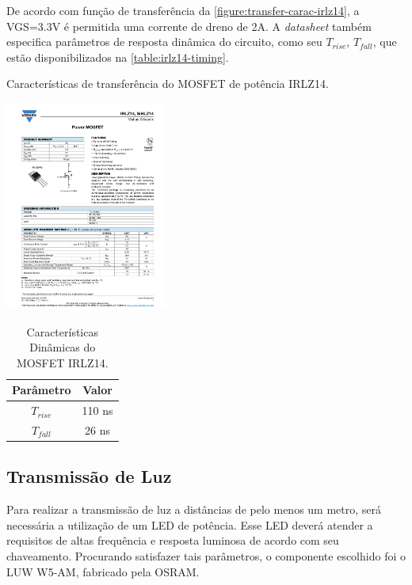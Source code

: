 	De acordo com função de transferência da \autoref{figure:transfer-carac-irlz14}, a VGS=3.3V é permitida uma corrente de dreno de 2A. A \textit{datasheet} também especifica parâmetros de resposta dinâmica do circuito, como seu $T_{rise}$, $T_{fall}$, que estão disponibilizados na \autoref{table:irlz14-timing}.
	
	\begin{chart}[h]
		\caption{\label{figure:transfer-carac-irlz14}Características de transferência do MOSFET de potência IRLZ14.}
		\centering
		\includegraphics[page=3, width=0.4\textwidth, trim={12cm 16.5cm 2.2cm 5cm}, clip]{circuits/irlz14.pdf}
	\end{chart}

	\begin{table}[h]
		\caption{Características Dinâmicas do MOSFET IRLZ14.}
		\centering
		\begin{tabular}{c c}
			\hline
			Parâmetro  & Valor  \\ \hline
			$T_{rise}$ & 110 ns \\
			$T_{fall}$ & 26 ns  \\ \hline
		\end{tabular}
		\label{table:irlz14-timing}
	\end{table}

	\subsection{Transmissão de Luz}
		
	Para realizar a transmissão de luz a distâncias de pelo menos um metro, será necessária a utilização de um LED de potência. Esse LED deverá atender a requisitos de altas frequência e resposta luminosa de acordo com seu chaveamento. Procurando satisfazer tais parâmetros, o componente escolhido foi o LUW W5-AM, fabricado pela OSRAM.

